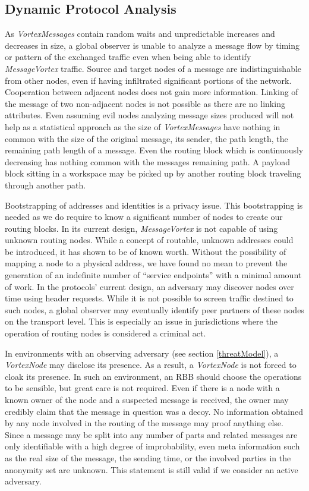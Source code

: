 \documentclass[acmsmall, screen, final, natbib=false]{acmart}
\begin{document}
	\subsection{Dynamic Protocol Analysis\label{sec:dynamicAnalysis}}
	As \emph{VortexMessages} contain random waits and unpredictable increases and decreases in size, a global observer is unable to analyze a message flow by timing or pattern of the exchanged traffic even when being able to identify \emph{MessageVortex} traffic. Source and target nodes of a message are indistinguishable from other nodes, even if having infiltrated significant portions of the network. Cooperation between adjacent nodes does not gain more information. Linking of the message of two non-adjacent nodes is not possible as there are no linking attributes. Even assuming evil nodes analyzing message sizes produced will not help as a statistical approach as the size of \emph{VortexMessages} have nothing in common with the size of the original message, its sender, the path length, the remaining path length of a message. Even the routing block which is continuously decreasing has nothing common with the messages remaining path. A payload block sitting in a workspace may be picked up by another routing block traveling through another path.
	
	Bootstrapping of addresses and identities is a privacy issue. This bootstrapping is needed as we do require to know a significant number of nodes to create our routing blocks. In its current design, \emph{MessageVortex} is not capable of using unknown routing nodes. While a concept of routable, unknown addresses could be introduced, it has shown to be of known worth. Without the possibility of mapping a node to a physical address, we have found no mean to prevent the generation of an indefinite number of ``service endpoints'' with a minimal amount of work. In the protocols' current design, an adversary may discover nodes over time using header requests. While it is not possible to screen traffic destined to such nodes, a global observer may eventually identify peer partners of these nodes on the transport level. This is especially an issue in jurisdictions where the operation of routing nodes is considered a criminal act. 
	
	In environments with an observing adversary (see section \ref{threatModel}), a \emph{VortexNode} may disclose its presence. As a result, a \emph{VortexNode} is not forced to cloak its presence. In such an environment, an RBB should choose the operations to be sensible, but great care is not required. Even if there is a node with a known owner of the node and a suspected message is received, the owner may credibly claim that the message in question was a decoy. No information obtained by any node involved in the routing of the message may proof anything else. Since a message may be split into any number of parts and related messages are only identifiable with a high degree of improbability, even meta information such as the real size of the message, the sending time, or the involved parties in the anonymity set are unknown. This statement is still valid if we consider an active adversary.
	
\end{document}

